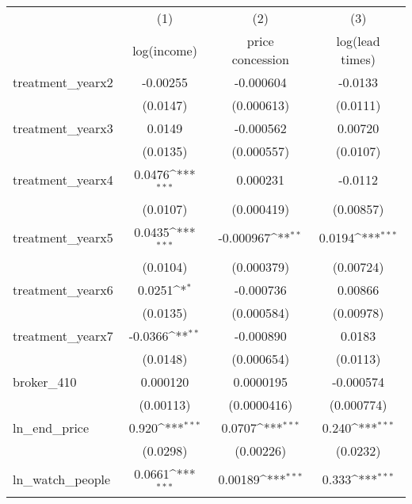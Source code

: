 {
\def\sym#1{\ifmmode^{#1}\else\(^{#1}\)\fi}
\begin{tabular}{l*{3}{c}}
\toprule
            &\multicolumn{1}{c}{(1)}&\multicolumn{1}{c}{(2)}&\multicolumn{1}{c}{(3)}\\
            &\multicolumn{1}{c}{log(income)}&\multicolumn{1}{c}{price concession}&\multicolumn{1}{c}{log(lead times)}\\
\midrule
treatment\_yearx2&    -0.00255         &   -0.000604         &     -0.0133         \\
            &    (0.0147)         &  (0.000613)         &    (0.0111)         \\
\addlinespace
treatment\_yearx3&      0.0149         &   -0.000562         &     0.00720         \\
            &    (0.0135)         &  (0.000557)         &    (0.0107)         \\
\addlinespace
treatment\_yearx4&      0.0476\sym{***}&    0.000231         &     -0.0112         \\
            &    (0.0107)         &  (0.000419)         &   (0.00857)         \\
\addlinespace
treatment\_yearx5&      0.0435\sym{***}&   -0.000967\sym{**} &      0.0194\sym{***}\\
            &    (0.0104)         &  (0.000379)         &   (0.00724)         \\
\addlinespace
treatment\_yearx6&      0.0251\sym{*}  &   -0.000736         &     0.00866         \\
            &    (0.0135)         &  (0.000584)         &   (0.00978)         \\
\addlinespace
treatment\_yearx7&     -0.0366\sym{**} &   -0.000890         &      0.0183         \\
            &    (0.0148)         &  (0.000654)         &    (0.0113)         \\
\addlinespace
broker\_410  &    0.000120         &   0.0000195         &   -0.000574         \\
            &   (0.00113)         & (0.0000416)         &  (0.000774)         \\
\addlinespace
ln\_end\_price&       0.920\sym{***}&      0.0707\sym{***}&       0.240\sym{***}\\
            &    (0.0298)         &   (0.00226)         &    (0.0232)         \\
\addlinespace
ln\_watch\_people&      0.0661\sym{***}&     0.00189\sym{***}&       0.333\sym{***}\\

\end{tabular}}
